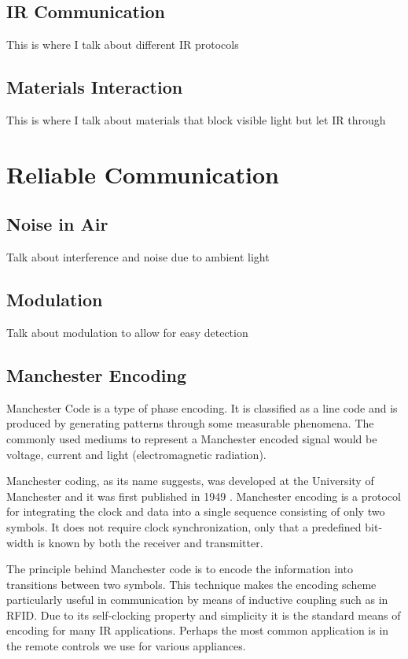 \subsection{IR Communication}
This is where I talk about different IR protocols

\subsection{Materials Interaction}
This is where I talk about materials that block visible light but let IR through


\section{Reliable Communication}

\subsection{Noise in Air}
Talk about interference and noise due to ambient light

\subsection{Modulation}
Talk about modulation to allow for easy detection

\subsection{Manchester Encoding}
Manchester Code is a type of phase encoding. It is classified as a line code and is produced by generating patterns through some measurable phenomena. The commonly used mediums to represent a Manchester encoded signal would be voltage, current and light (electromagnetic radiation).

Manchester coding, as its name suggests, was developed at the University of Manchester and it was first published in 1949 \cite{Jameel2019}. Manchester encoding is a protocol for integrating the clock and data into a single sequence consisting of only two symbols. It does not require clock synchronization, only that a predefined bit-width is known by both the receiver and transmitter. 

The principle behind Manchester code is to encode the information into transitions between two symbols. This technique makes the encoding scheme particularly useful in communication by means of inductive coupling such as in RFID. Due to its self-clocking property and simplicity it is the standard means of encoding for many IR applications. Perhaps the most common application is in the remote controls we use for various appliances.

